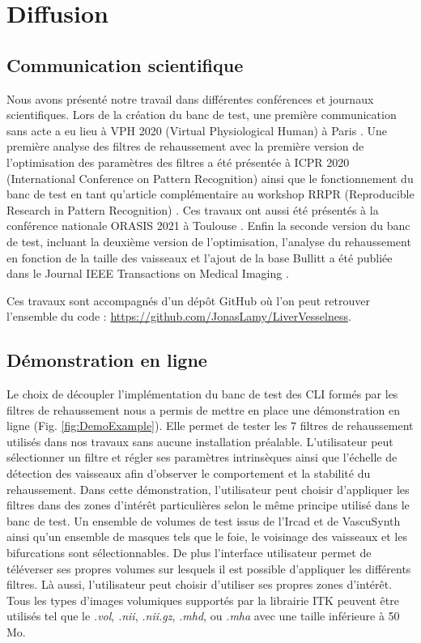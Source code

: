 \section{Diffusion}

\subsection{Communication scientifique}
Nous avons présenté notre travail dans différentes conférences et journaux scientifiques. Lors de la création du banc de test, une première communication sans acte a eu lieu à VPH 2020 (Virtual Physiological Human) à Paris \cite{Lamy2020_VPH_bench}. Une première analyse des filtres de rehaussement avec la première version de l'optimisation des paramètres des filtres a été présentée à ICPR 2020 (International Conference on Pattern Recognition) \cite{Lamy2020_ICPR} ainsi que le fonctionnement du banc de test en tant qu'article complémentaire au workshop RRPR (Reproducible Research in Pattern Recognition) \cite{Lamy2021_RRPR}. Ces travaux ont aussi été présentés à la  conférence nationale ORASIS 2021 à Toulouse \cite{Lamy2021_ORASIS}. Enfin la seconde version du banc de test, incluant la deuxième version de l'optimisation, l'analyse du rehaussement en fonction de la taille des vaisseaux et l'ajout de la base Bullitt a été publiée dans le Journal IEEE Transactions on Medical Imaging \cite{Lamy2022_TMI}.

Ces travaux sont accompagnés d'un dépôt GitHub où l'on peut retrouver l'ensemble du code : \url{https://github.com/JonasLamy/LiverVesselness}. 


\subsection{Démonstration en ligne}

Le choix de découpler l'implémentation du banc de test des CLI formés par les filtres de rehaussement nous a permis de mettre en place une démonstration en ligne (Fig. \ref{fig:DemoExample}). Elle permet de tester les 7 filtres de rehaussement utilisés dans nos travaux sans aucune installation préalable. L'utilisateur peut sélectionner un filtre et régler ses paramètres intrinsèques ainsi que l'échelle de détection des vaisseaux afin d'observer le comportement et la stabilité du rehaussement. Dans cette démonstration, l'utilisateur peut choisir d'appliquer les filtres dans des zones d'intérêt particulières selon le même principe utilisé dans le banc de test. Un ensemble de volumes de test issus de l'Ircad et de VascuSynth ainsi qu'un ensemble de masques tels que le foie, le voisinage des vaisseaux et les bifurcations sont sélectionnables. De plus l'interface utilisateur permet de téléverser ses propres volumes sur lesquels il est possible d’appliquer les différents filtres. Là aussi, l'utilisateur peut choisir d'utiliser ses propres zones d'intérêt. Tous les types d'images volumiques supportés par la librairie ITK peuvent être utilisés tel que le \textit{.vol}, \textit{.nii}, \textit{.nii.gz}, \textit{.mhd}, ou \textit{.mha} avec une taille inférieure à 50 Mo.

